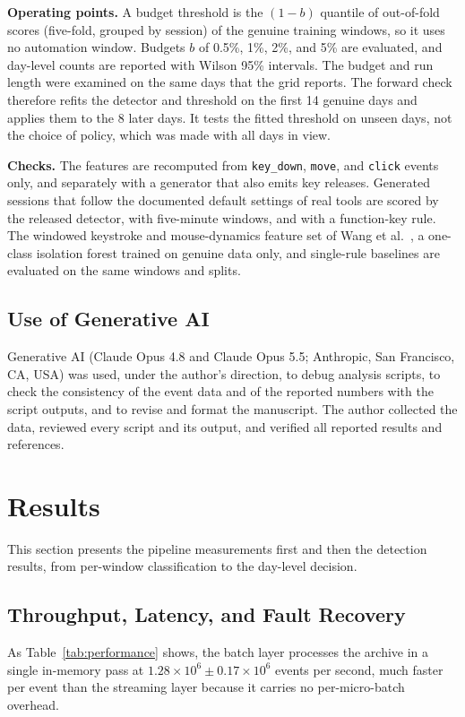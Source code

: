 \documentclass[sensors,article,submit,pdftex,oneauthor]{Definitions/mdpi}
\begin{document}
\textbf{Operating points.} A budget threshold is the $(1-b)$ quantile of out-of-fold scores (five-fold, grouped by session) of the genuine training windows, so it uses no automation window. Budgets $b$ of 0.5\%, 1\%, 2\%, and 5\% are evaluated, and day-level counts are reported with Wilson 95\% intervals. The budget and run length were examined on the same days that the grid reports. The forward check therefore refits the detector and threshold on the first 14 genuine days and applies them to the 8 later days. It tests the fitted threshold on unseen days, not the choice of policy, which was made with all days in view.

\textbf{Checks.} The features are recomputed from \texttt{key\_down}, \texttt{move}, and \texttt{click} events only, and separately with a generator that also emits key releases. Generated sessions that follow the documented default settings of real tools are scored by the released detector, with five-minute windows, and with a function-key rule. The windowed keystroke and mouse-dynamics feature set of Wang et al.~\cite{wang2022siurua}, a one-class isolation forest trained on genuine data only, and single-rule baselines are evaluated on the same windows and splits.

\subsection{Use of Generative AI}
Generative AI (Claude Opus 4.8 and Claude Opus 5.5; Anthropic, San Francisco, CA, USA) was used, under the author's direction, to debug analysis scripts, to check the consistency of the event data and of the reported numbers with the script outputs, and to revise and format the manuscript. The author collected the data, reviewed every script and its output, and verified all reported results and references.

\section{Results}
\label{sec:results}

This section presents the pipeline measurements first and then the detection results, from per-window classification to the day-level decision.

\subsection{Throughput, Latency, and Fault Recovery}
\label{sec:throughput}
As Table~\ref{tab:performance} shows, the batch layer processes the archive in a single in-memory pass at $1.28 \times 10^{6} \pm 0.17 \times 10^{6}$ events per second, much faster per event than the streaming layer because it carries no per-micro-batch overhead.
\end{document}
